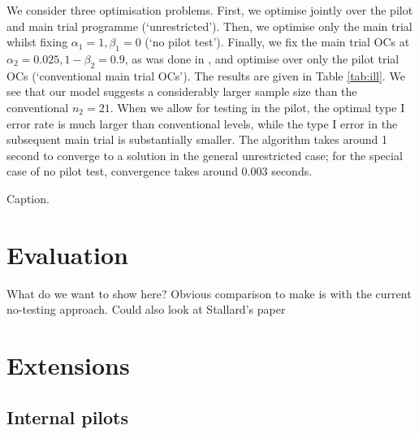 \documentclass[sagev]{sagej}
\begin{document}
We consider three optimisation problems. First, we optimise jointly over the pilot and main trial programme (`unrestricted'). Then, we optimise only the main trial whilst fixing $\alpha_1 = 1, \beta_1 = 0$ (`no pilot test'). Finally, we fix the main trial OCs at $\alpha_2 = 0.025, 1 - \beta_2 = 0.9$, as was done in \cite{Stallard2012}, and optimise over only the pilot trial OCs (`conventional main trial OCs'). The results are given in Table \ref{tab:ill}. We see that our model suggests a considerably larger sample size than the conventional $n_2 = 21$. When we allow for testing in the pilot, the optimal type I error rate is much larger than conventional levels, while the type I error in the subsequent main trial is substantially smaller. The algorithm takes around 1 second to converge to a solution in the general unrestricted case; for the special case of no pilot test, convergence takes around 0.003 seconds.

\begin{table}
\small\sf\centering
\caption{Caption.}

\label{tab:ill}
\end{table}





\section{Evaluation}

What do we want to show here? Obvious comparison to make is with the current no-testing approach. Could also look at Stallard's paper




\section{Extensions}\label{sec:extensions}

\subsection{Internal pilots}
\end{document}

